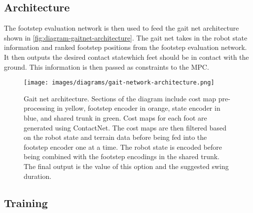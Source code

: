 

\subsection{Architecture}

The footstep evaluation network is then used to feed the gait net
architecture shown in \autoref{fig:diagram-gaitnet-architecture}. The
gait net takes in the robot state information and ranked footstep
positions from the footstep evaluation network. It then outputs the
desired contact state\textemdash which feet should be in contact with
the ground. This information is then passed as constraints to the MPC.

\begin{figure}
  \centering
  \texttt{[image: images/diagrams/gait-network-architecture.png]}
  \caption{Gait net architecture. Sections of the diagram include
    cost map pre-processing in yellow, footstep encoder in orange,
    state encoder in blue, and shared trunk in green. Cost maps for each
    foot are generated using ContactNet. The cost maps are then
    filtered based on the robot state and terrain data before being fed
    into the footstep encoder one at a time. The robot state is encoded
    before being combined with the footstep encodings in the shared
    trunk. The final output is the value of this option and the
  suggested swing duration.}
  \label{fig:diagram-gaitnet-architecture}
\end{figure}

\subsection{Training}
